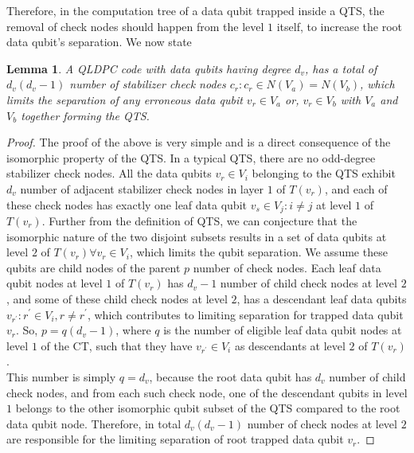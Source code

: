 \documentclass[%
 reprint,
 amsmath,amssymb,
 aps,
pra,
showkeys,
]{revtex4-2}
\newtheorem{lemma}{Lemma}
\begin{document}
Therefore, in the computation tree of a data qubit trapped inside a QTS, the removal of check nodes should happen from the level $1$ itself, to increase the root data qubit's separation.
We now state 
\begin{lemma}
    A QLDPC code with data qubits having degree $d_v$, has a total of $d_v(d_v - 1)$ number of stabilizer check nodes $c_r: c_r \in N(V_a) = N(V_b)$, which limits the separation of any erroneous data qubit $v_r \in V_a$ or, $v_r \in V_b$ with $V_a$ and $V_b$ together forming the QTS.
    \label{cor:cor-no-check-rem}
\end{lemma}
\begin{proof}
    The proof of the above is very simple and is a direct consequence of the isomorphic property of the QTS.
    In a typical QTS, there are no odd-degree stabilizer check nodes.
    All the data qubits $v_r \in V_i$ belonging to the QTS exhibit $d_v$ number of adjacent stabilizer check nodes in layer $1$ of $T(v_r)$, and each of these check nodes has exactly one leaf data qubit $v_s \in V_j : i \neq j$ at level $1$ of $T(v_r)$.
    Further from the definition of QTS, we can conjecture that the isomorphic nature of the two disjoint subsets results in a set of data qubits at level $2$ of $T(v_r) \forall v_r \in V_i$, which limits the qubit separation.
    We assume these qubits are child nodes of the parent $p$ number of check nodes.
    Each leaf data qubit nodes at level $1$ of $T(v_r)$ has $d_v - 1$ number of child check nodes at level $2$, and some of these child check nodes at level $2$, has a descendant leaf data qubits $v_{r^\prime}: r^\prime \in V_i, r \neq r^{\prime}$, which contributes to limiting separation for trapped data qubit $v_r$.
    So, $p = q(d_v - 1)$, where $q$ is the number of eligible leaf data qubit nodes at level $1$ of the CT, such that they have $v_{r^\prime} \in V_i$ as descendants at level $2$ of $T(v_r)$.\\
    This number is simply $q = d_v$, because the root data qubit has $d_v$ number of child check nodes, and from each such check node, one of the descendant qubits in level $1$ belongs to the other isomorphic qubit subset of the QTS compared to the root data qubit node.
    Therefore, in total $d_v(d_v - 1)$ number of check nodes at level $2$ are responsible for the limiting separation of root trapped data qubit $v_r$.
\end{proof}
\end{document}
